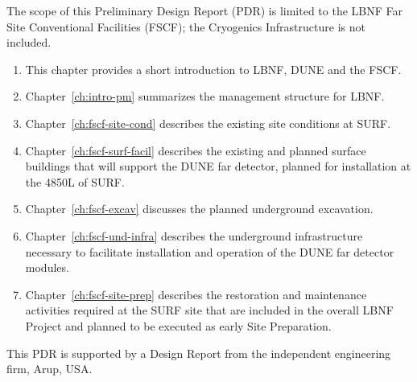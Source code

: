 The scope of this Preliminary Design Report (PDR) is limited to the LBNF Far Site Conventional Facilities (FSCF); the Cryogenics Infrastructure is not included.
\begin{enumerate}
\item This chapter provides a short introduction to LBNF, DUNE and the FSCF.
\item Chapter~\ref{ch:intro-pm} summarizes the management structure for LBNF.
\item Chapter~\ref{ch:fscf-site-cond} describes the existing site conditions at SURF. 
\item Chapter~\ref{ch:fscf-surf-facil} describes the existing and planned surface buildings that will support the DUNE far detector, planned for installation at the 4850L of SURF.
\item Chapter~\ref{ch:fscf-excav} discusses the planned underground excavation. 
\item Chapter~\ref{ch:fscf-und-infra} describes the underground infrastructure necessary to facilitate installation and operation of the DUNE far detector modules.
\item Chapter~\ref{ch:fscf-site-prep} describes the restoration and maintenance activities required at the SURF site that
are included in the overall LBNF Project and planned to be executed as early Site Preparation.
\end{enumerate}

This PDR is supported by a Design Report from the independent engineering firm, Arup, USA\cite{arup:fscf100pdr}.


